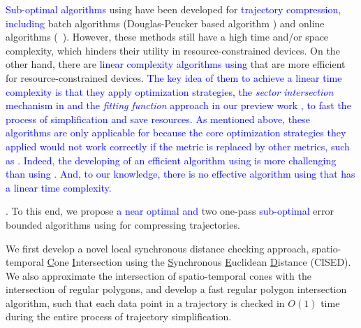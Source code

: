 \textcolor{blue}{Sub-optimal \lsa algorithms} using \sed have been developed for \textcolor{blue}{trajectory compression, including} batch algorithms (\eg Douglas-Peucker based algorithm \dpsed \cite{Meratnia:Spatiotemporal}) and online algorithms (\eg\ \squishe \cite{Muckell:Compression}).
However, these methods still have a high time and/or space complexity, which hinders their utility in resource-constrained devices. %
%
On the other hand, there are \textcolor{blue}{linear complexity \lsa algorithms using \ped} \cite{Williams:Longest, Sklansky:Cone, Dunham:Cone, Zhao:Sleeve, Lin:Operb} that are more efficient for resource-constrained devices. 
%
\textcolor{blue}{The key idea of them to achieve a linear time complexity is that they apply optimization strategies, \eg the \textit{sector intersection} mechanism in \cite{Williams:Longest, Sklansky:Cone, Dunham:Cone, Zhao:Sleeve} and the \textit{fitting function} approach in our preview work \cite {Lin:Operb}, to fast the process of simplification and save resources. 
As mentioned above, these algorithms are only applicable for \ped because the core optimization strategies they applied would not work correctly if the \ped metric is replaced by other metrics, such as \sed.} 
\textcolor{blue}{Indeed, {the developing of an efficient \lsa algorithm using \sed is more challenging than using \ped}.}
\textcolor{blue}{And, to our knowledge, there is no effective \lsa algorithm using \sed that has a linear time complexity.}





.
To this end, we propose \textcolor{blue}{ a near optimal and} two one-pass \textcolor{blue}{sub-optimal} error bounded \lsa algorithms using \sed for compressing trajectories. %

 We first develop a novel local synchronous distance checking approach, \ie spatio-temporal \underline{C}one \underline{I}ntersection using the \underline{S}ynchronous \underline{E}uclidean \underline{D}istance (CISED).
We also approximate the intersection of spatio-temporal cones with the intersection of regular polygons, and develop a fast regular polygon intersection algorithm, such that each data point in a trajectory is checked in $O(1)$ time during the entire process of trajectory simplification.

